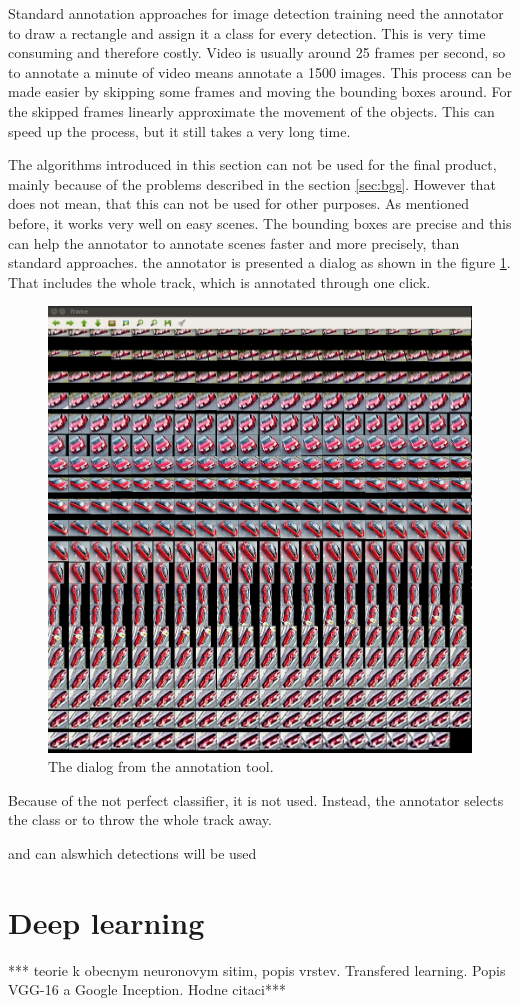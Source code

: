 \documentclass[a4paper,12pt,titlepage]{article}
\numberwithin{figure}{section}
\begin{document}
Standard annotation approaches for image detection training need the annotator to draw a rectangle and assign it a class for every detection. This is very time consuming and therefore costly. Video is usually around 25 frames per second, so to annotate a minute of video means annotate a 1500 images. This process can be made easier by skipping some frames and moving the bounding boxes around. For the skipped frames linearly approximate the movement of the objects. This can speed up the process, but it still takes a very long time. 


The algorithms introduced in this section can not be used for the final product, mainly because of the problems described in the section \ref{sec:bgs}. However that does not mean, that this can not be used for other purposes. As mentioned before, it works very well on easy scenes. The bounding boxes are precise and this can help the annotator to annotate scenes faster and more precisely, than standard approaches. the annotator is presented a dialog as shown in the figure \ref{fig:labeling}. That includes the whole track, which is annotated through one click. 


\begin{figure}[h!]
\centering
\includegraphics[width=0.5\linewidth]{fig/omni_labeling.png}
\caption{The dialog from the annotation tool.}
\label{fig:labeling}
\end{figure}


Because of the not perfect classifier, it is not used. Instead, the annotator selects the class or to throw the whole track away.


and can alswhich detections will be used



\section{Deep learning}
*** teorie k obecnym neuronovym sitim, popis vrstev. Transfered learning. Popis VGG-16 a Google Inception. Hodne citaci***
\end{document}
